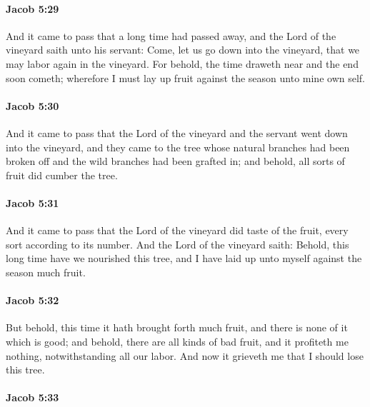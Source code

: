 		\paragraph{Jacob 5:29} %
			\label{JACOB-5-29}

			And it came to pass that a long time had passed away,
			and the Lord of the vineyard saith unto his servant:
			Come, let us go down into the vineyard,
			that we may labor again in the vineyard.
			For behold, the time draweth near and the end soon cometh;
			wherefore I must lay up fruit against the season unto mine own self.

		\paragraph{Jacob 5:30} %
			\label{JACOB-5-30}

			And it came to pass that
			the Lord of the vineyard and the servant went down into the vineyard,
			and they came to the tree whose natural branches had been broken off
			and the wild branches had been grafted in;
			and behold, all sorts of fruit did cumber the tree.

		\paragraph{Jacob 5:31} %
			\label{JACOB-5-31}

			And it came to pass that the Lord of the vineyard
			did taste of the fruit, every sort according to its number.
			And the Lord of the vineyard saith:
			Behold, this long time have we nourished this tree,
			and I have laid up unto myself against the season much fruit.

		\paragraph{Jacob 5:32} %
			\label{JACOB-5-32}

			But behold, this time it hath brought forth much fruit,
			and there is none of it which is good;
			and behold, there are all kinds of bad fruit,
			and it profiteth me nothing, notwithstanding all our labor.
			And now it grieveth me that I should lose this tree.

		\paragraph{Jacob 5:33} %
			\label{JACOB-5-33}

